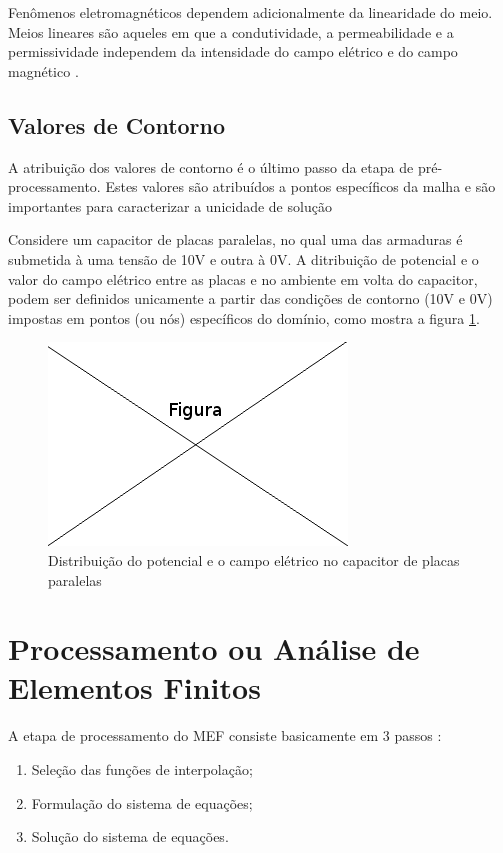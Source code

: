 \documentclass[
    12pt,               %
    openright,          %
    oneside,
    a4paper,            %
    english,            %
    french,             %
    spanish,            %
    brazil              %
    ]{abntex2}
\begin{document}
Fenômenos eletromagnéticos dependem adicionalmente da linearidade do meio. Meios lineares são aqueles em que a condutividade, a permeabilidade e a permissividade independem da intensidade do campo elétrico e do campo magnético \cite[p. 20]{sadiku} .


\subsection{Valores de Contorno}
A atribuição dos valores de contorno é o último passo da etapa de pré- processamento. Estes valores são atribuídos a pontos específicos da malha e são importantes para caracterizar a unicidade de solução \cite[p. 7]{zien}

Considere um capacitor de placas paralelas, no qual uma das armaduras é submetida à uma tensão de 10V e outra à 0V. A ditribuição de potencial e o valor do campo elétrico entre as placas e no ambiente em volta do capacitor, podem ser definidos unicamente a partir das condições de contorno (10V e 0V) impostas em pontos (ou nós) específicos do domínio, como mostra a figura \ref{fig:capacitor}.

\begin{figure}[!htb]
\centering
\includegraphics[scale=0.5]{figuras/temp.png}
\caption{Distribuição do potencial e o campo elétrico no capacitor de placas paralelas}
\label{fig:capacitor}
\end{figure}


\section{Processamento ou Análise de Elementos Finitos}
\label{sec:proc}

A etapa de processamento do MEF consiste basicamente em 3 passos \cite[p. 31]{jin}:

\begin{enumerate}  
\item Seleção das funções de interpolação;
\item Formulação do sistema de equações;
\item Solução do sistema de equações. 
\end{enumerate}
\end{document}
